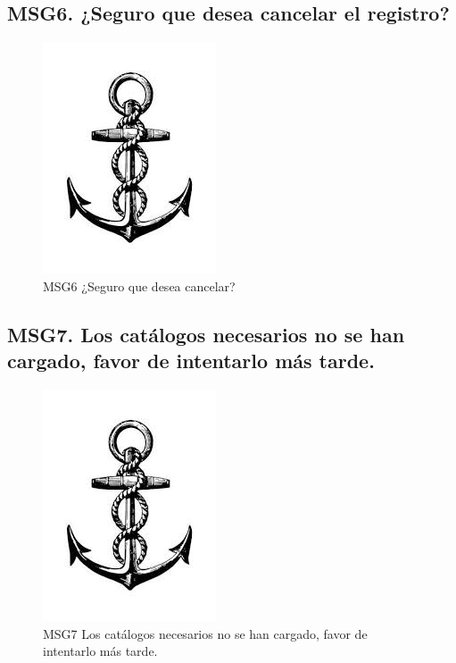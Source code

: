 \subsection{MSG6. ¿Seguro que desea cancelar el registro?}
    \begin{figure}[htbp]
        \begin{center}
            \includegraphics[width=.4\textwidth]{images/MSG/ancla}
            \caption{MSG6 ¿Seguro que desea cancelar?}
            \label{fig:MSG6}
        \end{center}
    \end{figure}

\subsection{MSG7. Los catálogos necesarios no se han cargado, favor de intentarlo más tarde.}
    \begin{figure}[htbp]
        \begin{center}
            \includegraphics[width=.4\textwidth]{images/MSG/ancla}
            \caption{MSG7 Los catálogos necesarios no se han cargado, favor de intentarlo más tarde.}
            \label{fig:MSG7}
        \end{center}
    \end{figure}

